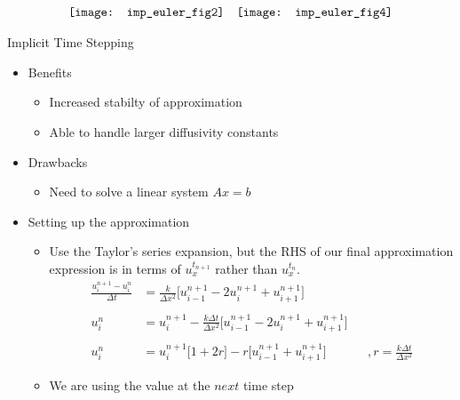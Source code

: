 \documentclass[compress]{beamer}
\begin{document}
\begin{frame}
\[
\begin{array}{c c}
\texttt{[image: imp\_euler\_fig2]} 	&	\texttt{[image: imp\_euler\_fig4]} 	
\end{array}	
\]
\end{frame}


\begin{frame}
\begin{center}
Implicit Time Stepping
\end{center}
\begin{itemize}
\item Benefits
\begin{itemize}
\item Increased stabilty of approximation
\item Able to handle larger diffusivity constants
\end{itemize}
\item Drawbacks
\begin{itemize}
\item Need to solve a linear system  $Ax=b$
\end{itemize}
\end{itemize}
\end{frame}

\begin{frame}
\begin{itemize}
\item Setting up the approximation
\begin{itemize}
\item Use the Taylor's series expansion, but the RHS of our final approximation expression is in terms of $u_x^{t_{n+1}}$ rather than $u_x^{t_{n}}$. 
\begin{align*}
\frac{u_i^{n+1}-u_i^n}{\Delta t}	&=\frac{k}{\Delta x^2}\Big[u_{i-1}^{n+1}-2u_i^{n+1}+u_{i+1}^{n+1}\Big]	\\
									&																			\\
u_i^n								&=u_i^{n+1}-\frac{k\Delta t}{\Delta x^2}\Big[u_{i-1}^{n+1}-2u_i^{n+1}+u_{i+1}^{n+1}\Big] 	\\
									&																			\\
u_i^n								&=u_i^{n+1}\Big[1+2r\Big]-r\Big[u_{i-1}^{n+1}+u_{i+1}^{n+1}\Big]			&&,r=\frac{k\Delta t}{\Delta x^2}						
\end{align*}
\item We are using the value at the $next$ time step
\end{itemize}
\end{itemize}
\end{frame}
\end{document}
